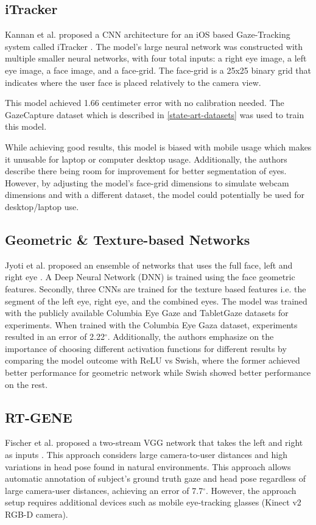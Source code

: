 \subsection{iTracker}
Kannan et al. proposed a CNN architecture for an iOS based Gaze-Tracking system called iTracker \cite{iTracker}. The model's large neural network was constructed with multiple smaller neural networks, with four total inputs: a right eye image, a left eye image, a face image, and a face-grid. The face-grid is a 25x25 binary grid that indicates where the user face is placed relatively to the camera view. 

This model achieved 1.66 centimeter error with no calibration needed. The GazeCapture dataset which is described in \autoref{state-art-datasets} was used to train this model.

While achieving good results, this model is biased with mobile usage which makes it unusable for laptop or computer desktop usage. Additionally, the authors describe there being room for improvement for better segmentation of eyes. However, by adjusting the model's face-grid dimensions to simulate webcam dimensions and with a different dataset, the model could potentially be used for desktop/laptop use.

\subsection{Geometric \& Texture-based Networks}
Jyoti et al. proposed an ensemble of networks that uses the full face, left and right eye \cite{jyoti_automatic_2018}.
A Deep Neural Network (DNN) is trained using the face geometric features. Secondly, three CNNs are trained for the texture based features i.e. the segment of the left eye, right eye, and the combined eyes. The model was trained with the publicly available Columbia Eye Gaze and TabletGaze datasets for experiments. When trained with the Columbia Eye Gaza dataset, experiments resulted in an error of 2.22$^{\circ}$. Additionally, the authors emphasize on the importance of choosing
different activation functions for different results by comparing the model outcome with ReLU vs Swish, where the former achieved better performance for geometric network while Swish showed better performance on the rest.

\subsection{RT-GENE}
Fischer et al. proposed a two-stream VGG network that takes the left and right as inputs \cite{fischer_rt-gene_2018}. This approach considers large camera-to-user distances and high variations in head pose found in natural environments. This approach allows automatic annotation of subject's ground truth gaze and head pose regardless of large camera-user distances, achieving an error of 7.7$^{\circ}$. However, the approach setup requires additional devices such as mobile eye-tracking glasses (Kinect v2 RGB-D camera).

